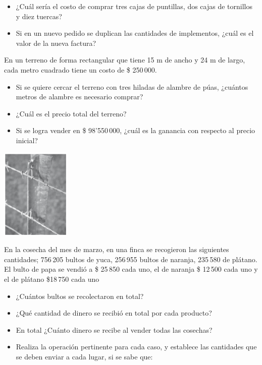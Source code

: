 \documentclass[letterpaper,11pt,twoside]{article}
\begin{document}
\begin{multicols}{2}
\begin{itemize}
\item ¿Cuál sería el costo de comprar tres cajas de puntillas, dos cajas de tornillos y
diez tuercas?
\item Si en un nuevo pedido se duplican las cantidades de implementos, ¿cuál es el valor de la nueva factura?
\end{itemize}
\end{multicols}
\begin{minipage}{.65\textwidth}
En un terreno de forma rectangular que tiene 15 m de ancho y 24 m de largo, cada metro cuadrado tiene un costo de \$ 250\,000.
\begin{itemize}
\item  Si se quiere cercar el terreno con tres hiladas de alambre de púas, ¿cuántos metros de alambre es necesario comprar?
\item  ¿Cuál es el precio total del terreno?
\item  Si se logra vender en \$ 98'550\,000, ¿cuál es la ganancia con respecto al precio inicial?	
\end{itemize}
\end{minipage}\hfill
\begin{minipage}{.35\textwidth}
\includegraphics[scale=1]{Images/terreno_a.png} 
\end{minipage}
En la cosecha del mes de marzo, en una finca se recogieron las siguientes cantidades; 756\,205 bultos de yuca, 256\,955 bultos de naranja, 235\,580 de plátano. El bulto de papa se vendió a \$ 25\,850 cada uno, el de naranja \$ 12\,500
cada uno y el de plátano \$18\,750 cada uno
\begin{itemize}
\item ¿Cuántos bultos se recolectaron en total?
\item ¿Qué cantidad de dinero se recibió en total por cada producto?
\item En total ¿Cuánto dinero se recibe al vender todas las cosechas?
\item Realiza la operación pertinente para cada caso, y establece las cantidades que se
deben enviar a cada lugar, si se sabe que:
\end{itemize}
\end{document}
